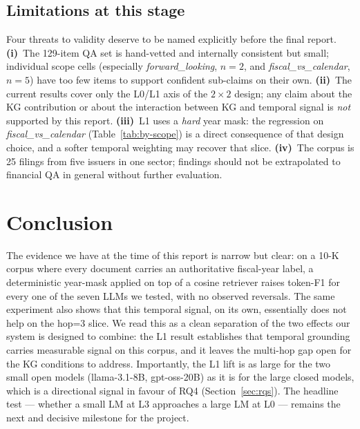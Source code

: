 \documentclass[11pt]{article}
\begin{document}
\subsection{Limitations at this stage}
\label{sec:limits}
Four threats to validity deserve to be named explicitly before the
final report. \textbf{(i)}~The 129-item QA set is hand-vetted and
internally consistent but small; individual scope cells (especially
\textit{forward\_looking}, $n=2$, and \textit{fiscal\_vs\_calendar},
$n=5$) have too few items to support confident sub-claims on their
own. \textbf{(ii)}~The current results cover only the L0/L1 axis of
the $2\times2$ design; any claim about the KG contribution or about
the interaction between KG and temporal signal is \emph{not} supported
by this report. \textbf{(iii)}~L1 uses a \emph{hard} year mask: the
regression on \textit{fiscal\_vs\_calendar} (Table~\ref{tab:by-scope})
is a direct consequence of that design choice, and a softer
temporal weighting may recover that slice. \textbf{(iv)}~The corpus
is 25 filings from five issuers in one sector; findings should not
be extrapolated to financial QA in general without further
evaluation.

\section{Conclusion}
\label{sec:conclusion}

The evidence we have at the time of this report is narrow but clear:
on a 10-K corpus where every document carries an authoritative
fiscal-year label, a deterministic year-mask applied on top of a
cosine retriever raises token-F1 for every one of the seven LLMs we
tested, with no observed reversals. The same experiment also shows
that this temporal signal, on its own, essentially does not help on
the hop=3 slice. We read this as a clean separation of the two
effects our system is designed to combine: the L1 result establishes
that temporal grounding carries measurable signal on this corpus, and
it leaves the multi-hop gap open for the KG conditions to address.
Importantly, the L1 lift is as large for the two small open models
(llama-3.1-8B, gpt-oss-20B) as it is for the large closed models,
which is a directional signal in favour of RQ4 (Section~\ref{sec:rqs}).
The headline test --- whether a small LM at L3 approaches a large LM
at L0 --- remains the next and decisive milestone for the project.
\end{document}
